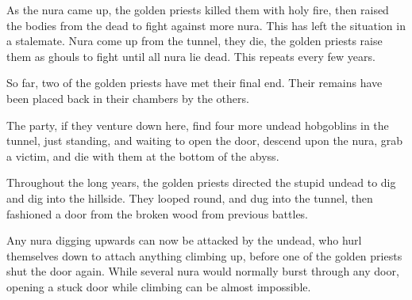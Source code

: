 \begin{multicols}{2}
\begin{exampletext}
As the nura came up, the golden priests killed them with holy fire, then raised the bodies from the dead to fight against more nura.  This has left the situation in a stalemate.  Nura come up from the tunnel, they die, the golden priests raise them as ghouls to fight until all nura lie dead.  This repeats every few years.

So far, two of the golden priests have met their final end.  Their remains have been placed back in their chambers by the others.

\end{exampletext}


The party, if they venture down here, find four more undead hobgoblins in the tunnel, just standing, and waiting to open the door, descend upon the nura, grab a victim, and die with them at the bottom of the abyss.

\begin{exampletext}

	Throughout the long years, the golden priests directed the stupid undead to dig and dig into the hillside.
	They looped round, and dug into the tunnel, then fashioned a door from the broken wood from previous battles.

Any nura digging upwards can now be attacked by the undead, who hurl themselves down to attach anything climbing up, before one of the golden priests shut the door again.
While several nura would normally burst through any door, opening a stuck door while climbing can be almost impossible.

\end{exampletext}

\end{multicols}

